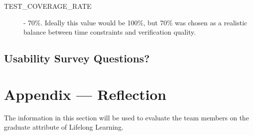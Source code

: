 \documentclass[12pt, titlepage]{article}
\begin{document}
\begin{description}
  \item[TEST\_COVERAGE\_RATE] - 70\%. Ideally this value would be 100\%, but 70\% was chosen as a realistic balance between time constraints and verification quality.
\end{description}

\subsection{Usability Survey Questions?}


\newpage{}
\section*{Appendix --- Reflection}


The information in this section will be used to evaluate the team members on the
graduate attribute of Lifelong Learning.


\end{document}
